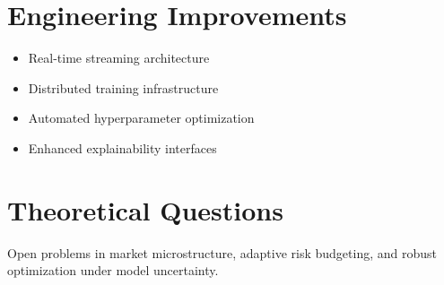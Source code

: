 \documentclass[12pt,letterpaper]{report}
\theoremstyle{definition}
\begin{document}
\section{Engineering Improvements}
\begin{itemize}
  \item Real-time streaming architecture
  \item Distributed training infrastructure
  \item Automated hyperparameter optimization
  \item Enhanced explainability interfaces
\end{itemize}

\section{Theoretical Questions}
Open problems in market microstructure, adaptive risk budgeting, and robust optimization under model uncertainty.

\backmatter
\cleardoublepage
{}
{}


\end{document}
